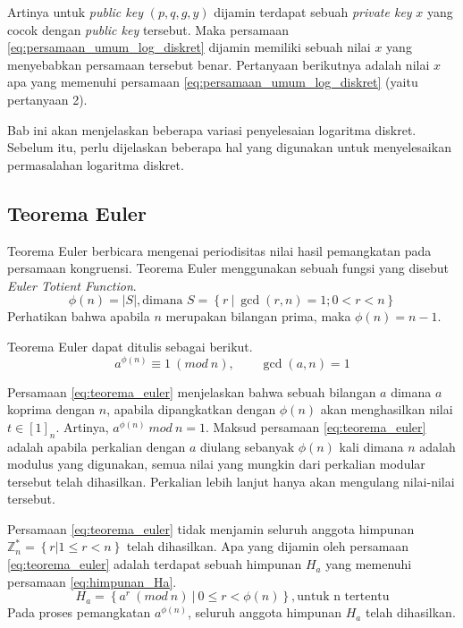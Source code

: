 Artinya untuk \textit{public key} $ (p, q, g, y) $ dijamin terdapat sebuah \textit{private key} $ x $ yang cocok dengan \textit{public key} tersebut. Maka persamaan \eqref{eq:persamaan_umum_log_diskret} dijamin memiliki sebuah nilai $ x $ yang menyebabkan persamaan tersebut benar. Pertanyaan berikutnya adalah nilai $ x $ apa yang memenuhi persamaan \eqref{eq:persamaan_umum_log_diskret} (yaitu pertanyaan 2).

Bab ini akan menjelaskan beberapa variasi penyelesaian logaritma diskret. Sebelum itu, perlu dijelaskan beberapa hal yang digunakan untuk menyelesaikan permasalahan logaritma diskret.

\subsection {Teorema Euler}

Teorema Euler berbicara mengenai periodisitas nilai hasil pemangkatan pada persamaan kongruensi. Teorema Euler menggunakan sebuah fungsi yang disebut \textit{Euler Totient Function}.\cite{stallings_cryptography}
\begin{equation}
\phi(n)=\left|S\right|, \text{dimana } S=\left\{r\ |\ \gcd (r,n)=1; 0 < r < n \right\}
\label{eq:euler_totient_function}
\end{equation}
Perhatikan bahwa apabila $ n $ merupakan bilangan prima, maka $ \phi(n)=n-1 $.

Teorema Euler dapat ditulis sebagai berikut.
\begin{equation}
a^{\phi(n)}\equiv 1\ (mod\ n), \qquad \gcd(a,n)=1
\label{eq:teorema_euler}
\end{equation}

Persamaan \eqref{eq:teorema_euler} menjelaskan bahwa sebuah bilangan $ a $ dimana $ a $ koprima dengan $ n $, apabila dipangkatkan dengan $ \phi(n) $ akan menghasilkan nilai $ t \in [1]_n $. Artinya, $ a^{\phi(n)}\ mod\ n=1 $. Maksud persamaan \eqref{eq:teorema_euler} adalah apabila perkalian dengan $ a $ diulang sebanyak $ \phi(n) $ kali dimana $ n $ adalah modulus yang digunakan, semua nilai yang mungkin dari perkalian modular tersebut telah dihasilkan. Perkalian lebih lanjut hanya akan mengulang nilai-nilai tersebut.

Persamaan \eqref{eq:teorema_euler} tidak menjamin seluruh anggota himpunan $ \mathbb{Z}_n^{*}=\left\{ r | 1 \leq r < n\right\} $ telah dihasilkan. Apa yang dijamin oleh persamaan \eqref{eq:teorema_euler} adalah terdapat sebuah himpunan $ H_a $ yang memenuhi persamaan \eqref{eq:himpunan_Ha}.
\begin{equation}
H_a=\left\{a^{r}\ (mod\ n)\ |\ 0 \leq r < \phi(n) \right\}, \text{untuk n tertentu}
\label{eq:himpunan_Ha}
\end{equation}
Pada proses pemangkatan $ a^{\phi(n)} $, seluruh anggota himpunan $ H_a $ telah dihasilkan.

